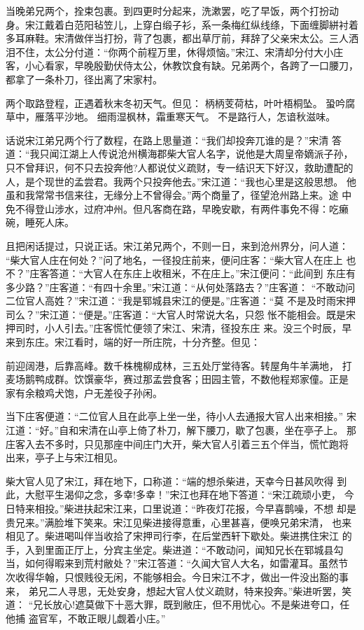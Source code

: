 当晚弟兄两个，拴束包裹。到四更时分起来，洗漱罢，吃了早饭，两个打扮动
身。宋江戴着白范阳毡笠儿，上穿白缎子衫，系一条梅红纵线绦，下面缠脚絣衬着
多耳麻鞋。宋清做伴当打扮，背了包裹，都出草厅前，拜辞了父亲宋太公。三人洒
泪不住，太公分付道：“你两个前程万里，休得烦恼。”宋江、宋清却分付大小庄
客，小心看家，早晚殷勤伏侍太公，休教饮食有缺。兄弟两个，各跨了一口腰刀，
都拿了一条朴刀，径出离了宋家村。

两个取路登程，正遇着秋末冬初天气。但见：
柄柄芰荷枯，叶叶梧桐坠。
蛩吟腐草中，雁落平沙地。
细雨湿枫林，霜重寒天气。
不是路行人，怎谙秋滋味。

话说宋江弟兄两个行了数程，在路上思量道：“我们却投奔兀谁的是？”宋清
答道：“我只闻江湖上人传说沧州横海郡柴大官人名字，说他是大周皇帝嫡派子孙，
只不曾拜识，何不只去投奔他?人都说仗义疏财，专一结识天下好汉，救助遭配的
人，是个现世的孟尝君。我两个只投奔他去。”宋江道：“我也心里是这般思想。
他虽和我常常书信来往，无缘分上不曾得会。”两个商量了，径望沧州路上来。途
中免不得登山涉水，过府冲州。但凡客商在路，早晚安歇，有两件事免不得：吃癞
碗，睡死人床。

且把闲话提过，只说正话。宋江弟兄两个，不则一日，来到沧州界分，问人道：
“柴大官人庄在何处？”问了地名，一径投庄前来，便问庄客：“柴大官人在庄上
也不？”庄客答道：“大官人在东庄上收租米，不在庄上。”宋江便问：“此间到
东庄有多少路？”庄客道：“有四十余里。”宋江道：“从何处落路去？”庄客道：
“不敢动问二位官人高姓？”宋江道：“我是郓城县宋江的便是。”庄客道：“莫
不是及时雨宋押司么？”宋江道：“便是。”庄客道：“大官人时常说大名，只怨
怅不能相会。既是宋押司时，小人引去。”庄客慌忙便领了宋江、宋清，径投东庄
来。没三个时辰，早来到东庄。宋江看时，端的好一所庄院，十分齐整。但见：

前迎阔港，后靠高峰。数千株槐柳成林，三五处厅堂待客。转屋角牛羊满地，
打麦场鹅鸭成群。饮馔豪华，赛过那孟尝食客；田园主管，不数他程郑家僮。正是
家有余粮鸡犬饱，户无差役子孙闲。

当下庄客便道：“二位官人且在此亭上坐一坐，待小人去通报大官人出来相接。”
宋江道：“好。”自和宋清在山亭上倚了朴刀，解下腰刀，歇了包裹，坐在亭子上。
那庄客入去不多时，只见那座中间庄门大开，柴大官人引着三五个伴当，慌忙跑将
出来，亭子上与宋江相见。

柴大官人见了宋江，拜在地下，口称道：“端的想杀柴进，天幸今日甚风吹得
到此，大慰平生渴仰之念，多幸!多幸！”宋江也拜在地下答道：“宋江疏顽小吏，
今日特来相投。”柴进扶起宋江来，口里说道：“昨夜灯花报，今早喜鹊噪，不想
却是贵兄来。”满脸堆下笑来。宋江见柴进接得意重，心里甚喜，便唤兄弟宋清，
也来相见了。柴进喝叫伴当收拾了宋押司行李，在后堂西轩下歇处。柴进携住宋江
的手，入到里面正厅上，分宾主坐定。柴进道：“不敢动问，闻知兄长在郓城县勾
当，如何得暇来到荒村敝处？”宋江答道：“久闻大官人大名，如雷灌耳。虽然节
次收得华翰，只恨贱役无闲，不能够相会。今日宋江不才，做出一件没出豁的事来，
弟兄二人寻思，无处安身，想起大官人仗义疏财，特来投奔。”柴进听罢，笑道：
“兄长放心!遮莫做下十恶大罪，既到敝庄，但不用忧心。不是柴进夸口，任他捕
盗官军，不敢正眼儿觑着小庄。”

